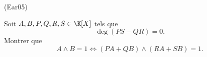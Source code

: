\begin{tiny}(Ear05)\end{tiny} Soit $A, B, P, Q, R, S \in \K[X]$ tels que
\[
 \deg(PS - QR) = 0.
\]
Montrer que
\[
 A \wedge B = 1 \Leftrightarrow (PA + QB) \wedge (RA + SB) = 1.
\]
